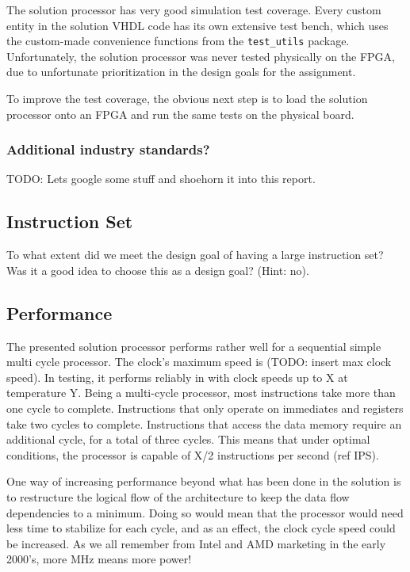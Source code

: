 The solution processor has very good simulation test coverage.
Every custom entity in the solution VHDL code has its own extensive test bench, which uses the custom-made convenience functions from the \texttt{test\_utils} package.
Unfortunately, the solution processor was never tested physically on the FPGA, due to unfortunate prioritization in the design goals for the assignment.

To improve the test coverage, the obvious next step is to load the solution processor onto an FPGA and run the same tests on the physical board.

\subsubsection{Additional industry standards?}

TODO: Lets google some stuff and shoehorn it into this report.

\subsection{Instruction Set}

To what extent did we meet the design goal of having a large instruction set?
Was it a good idea to choose this as a design goal? (Hint: no).

\subsection{Performance}

The presented solution processor performs rather well for a sequential simple multi cycle processor.
The clock's maximum speed is (TODO: insert max clock speed).
In testing, it performs reliably in with clock speeds up to X at temperature Y.
Being a multi-cycle processor, most instructions take more than one cycle to complete.
Instructions that only operate on immediates and registers take two cycles to complete.
Instructions that access the data memory require an additional cycle, for a total of three cycles.
This means that under optimal conditions, the processor is capable of X/2 instructions per second (ref IPS).

One way of increasing performance beyond what has been done in the solution is to restructure the logical flow of the architecture to keep the data flow dependencies to a minimum.
Doing so would mean that the processor would need less time to stabilize for each cycle, and as an effect, the clock cycle speed could be increased.
As we all remember from Intel and AMD marketing in the early 2000's, more MHz means more power!

